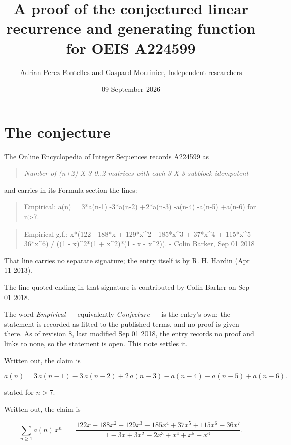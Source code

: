 \documentclass[11pt]{article}
\title{A proof of the conjectured linear recurrence and generating function for OEIS A224599}
\author{Adrian Perez Fontelles and Gaspard Moulinier, Independent researchers}
\date{09 September 2026}
\theoremstyle{definition}
\begin{document}
\maketitle
\section{The conjecture}

The Online Encyclopedia of Integer Sequences records \href{https://oeis.org/A224599}{A224599} as

\begin{quote}\itshape Number of (n+2) X 3 0..2 matrices with each 3 X 3 subblock idempotent\end{quote}

and carries in its Formula section the lines:

\begin{quote}\ttfamily Empirical: a(n) = 3*a(n-1) -3*a(n-2) +2*a(n-3) -a(n-4) -a(n-5) +a(n-6) for n>7.\end{quote}

\begin{quote}\ttfamily Empirical g.f.: x*(122 - 188*x + 129*x\textasciicircum{}2 - 185*x\textasciicircum{}3 + 37*x\textasciicircum{}4 + 115*x\textasciicircum{}5 - 36*x\textasciicircum{}6) / ((1 - x)\textasciicircum{}2*(1 + x\textasciicircum{}2)*(1 - x - x\textasciicircum{}2)). - Colin Barker, Sep 01 2018\end{quote}

That line carries no separate signature; the entry itself is by R. H. Hardin (Apr 11 2013).

The line quoted ending in that signature is contributed by Colin Barker on Sep 01 2018.

The word {\itshape Empirical} --- equivalently {\itshape Conjecture} --- is the entry's own: the statement is recorded as fitted to the published terms, and no proof is given there. As of revision 8, last modified Sep 01 2018, the entry records no proof and links to none, so the statement is open. This note settles it.

Written out, the claim is

\[a(n) = 3\,a(n-1) - 3\,a(n-2) + 2\,a(n-3) - a(n-4) - a(n-5) + a(n-6).\]

stated for $n > 7$.

Written out, the claim is

\[\sum_{n \ge 1} a(n)\,x^n \;=\; \frac{122x - 188x^{2} + 129x^{3} - 185x^{4} + 37x^{5} + 115x^{6} - 36x^{7}}{1 - 3x + 3x^{2} - 2x^{3} + x^{4} + x^{5} - x^{6}}.\]
\end{document}

